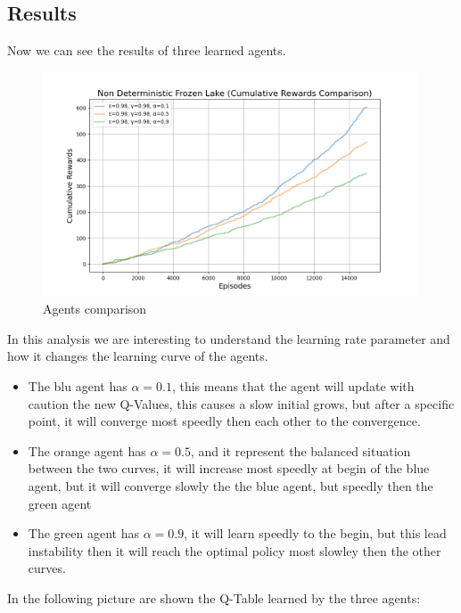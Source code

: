 \subsection{Results}
Now we can see the results of three learned agents.
\begin{figure}[H]
    \centering
    \includegraphics[width=0.99\textwidth]{images/cumulative_rewards_non_deterministic_comparison.png}
    \caption{Agents comparison}
    \label{fig:cumulative_rewards_non_deterministic_comparison}
\end{figure}
In this analysis we are interesting to understand the learning rate parameter and how it changes the learning curve of the agents.
\begin{itemize}
    \item The blu agent has $\alpha=0.1$, this means that the agent will update with caution the new Q-Values, this causes a slow initial grows, but after a specific point, it will converge most speedly then each other to the convergence.
    \item The orange agent has $\alpha=0.5$, and it represent the balanced situation between the two curves, it will increase most speedly at begin of the blue agent, but it will converge slowly the the blue agent, but speedly then the green agent
    \item The green agent has $\alpha=0.9$, it will learn speedly to the begin, but this lead instability then it will reach the optimal policy most slowley then the other curves.
\end{itemize}
In the following picture are shown the Q-Table learned by the three agents:
